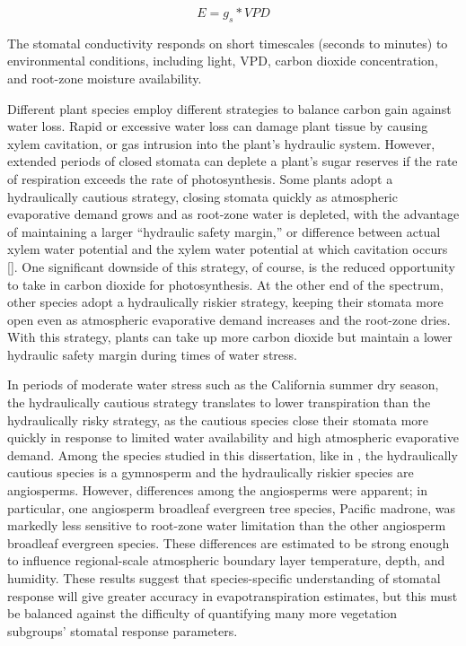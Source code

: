 \begin{equation}
E = g_s * VPD
\end{equation}

The stomatal conductivity responds on short timescales (seconds to minutes) to environmental conditions, including light, VPD, carbon dioxide concentration, and root-zone moisture availability.

Different plant species employ different strategies to balance carbon gain against water loss.  Rapid or excessive water loss can damage plant tissue by causing xylem cavitation, or gas intrusion into the plant's hydraulic system.  However, extended periods of closed stomata can deplete a plant's sugar reserves if the rate of respiration exceeds the rate of photosynthesis.  Some plants adopt a hydraulically cautious strategy, closing stomata quickly as atmospheric evaporative demand grows and as root-zone water is depleted, with the advantage of maintaining a larger ``hydraulic safety margin,'' or difference between actual xylem water potential and the xylem water potential at which cavitation occurs [\cite{choat2012global}]. One significant downside of this strategy, of course, is the reduced opportunity to take in carbon dioxide for photosynthesis.  At the other end of the spectrum, other species adopt a hydraulically riskier strategy, keeping their stomata more open even as atmospheric evaporative demand increases and the root-zone dries.  With this strategy, plants can take up more carbon dioxide but maintain a lower hydraulic safety margin during times of water stress.

In periods of moderate water stress such as the California summer dry season, the hydraulically cautious strategy translates to lower transpiration than the hydraulically risky strategy, as the cautious species close their stomata more quickly in response to limited water availability and high atmospheric evaporative demand.  Among the species studied in this dissertation, like in \cite{choat2012global}, the hydraulically cautious species is a gymnosperm and the hydraulically riskier species are angiosperms.  However, differences among the angiosperms were apparent; in particular, one angiosperm broadleaf evergreen tree species, Pacific madrone, was markedly less sensitive to root-zone water limitation than the other angiosperm broadleaf evergreen species.  These differences are estimated to be strong enough to influence regional-scale atmospheric boundary layer temperature, depth, and humidity.  These results suggest that species-specific understanding of stomatal response will give greater accuracy in evapotranspiration estimates, but this must be balanced against the difficulty of quantifying many more vegetation subgroups' stomatal response parameters.

